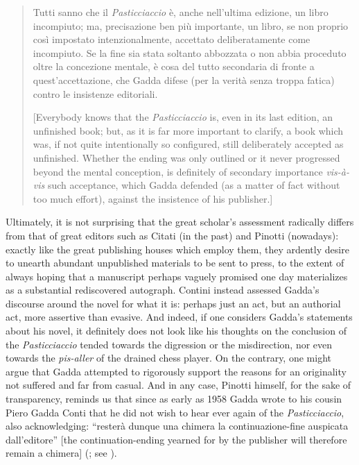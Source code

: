 \begin{review}
\begin{quote}
Tutti sanno che il \emph{Pasticciaccio} è, anche nell'ultima edizione,
un libro incompiuto; ma, precisazione ben più importante, un libro, se
non proprio così impostato intenzionalmente, accettato deliberatamente
come incompiuto. Se la fine sia stata soltanto abbozzata o non abbia
proceduto oltre la concezione mentale, è cosa del tutto secondaria di
fronte a quest'accettazione, che Gadda difese (per la verità senza
troppa fatica) contro le insistenze editoriali.

{[}Everybody knows that the \emph{Pasticciaccio} is, even in its last
edition, an unfinished book; but, as it is far more important to
clarify, a book which was, if not quite intentionally so configured,
still deliberately accepted as unfinished. Whether the ending was only
outlined or it never progressed beyond the mental conception, is
definitely of secondary importance \emph{vis-à-vis} such acceptance,
which Gadda defended (as a matter of fact without too much effort),
against the insistence of his publisher.{]}

\begin{flushright}
\citep[45--46]{contini_quarantanni_1989}
\end{flushright}

\end{quote} 

\noindent Ultimately, it is not surprising that the great scholar's assessment radically differs from that of great editors such as
Citati (in the past) and Pinotti (nowadays): exactly like the great
publishing houses which employ them, they ardently desire to
unearth abundant unpublished materials to be sent to press, to the
extent of always hoping that a manuscript perhaps vaguely promised
one day materializes as a substantial rediscovered autograph. Contini
instead assessed Gadda's discourse around the novel for what it is:
perhaps just an act, but an authorial act, more assertive than evasive.
And indeed, if one considers Gadda's statements about his
novel, it definitely does not look like his thoughts on the conclusion
of the \emph{Pasticciaccio} tended towards the digression or the
misdirection, nor even towards the \emph{pis-aller} of the drained chess
player. On the contrary, one might argue that Gadda attempted to
rigorously support the reasons for an originality not suffered and far
from casual. And in any case, Pinotti himself, for the sake of
transparency, reminds us that since as early as 1958 Gadda wrote to his
cousin Piero Gadda Conti that he did not wish to hear ever again of the
\emph{Pasticciaccio}, also acknowledging: ``resterà dunque una
chimera la continuazione-fine auspicata dall'editore'' {[}the continuation-ending yearned for
by the publisher will therefore remain a chimera{]} (\citealt[161]{gadda_conti_confessioni_1974}; see \citealt[346]{pinotti_nota_2018}).


\end{review}
